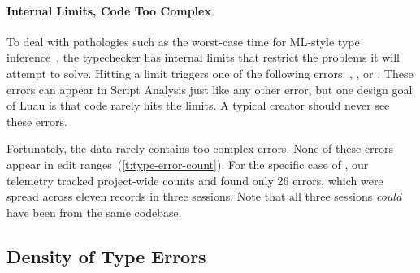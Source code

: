 \documentclass[english,submission,cleveref]{programming}
\begin{document}
\paragraph{Internal Limits, Code Too Complex}
\label{s:code-too-complex}

To deal with pathologies such as the worst-case time for ML-style type
inference~\cite{m-popl-1990,ktu-caap-1990}, the typechecker
has internal limits that restrict the problems it will attempt to solve.
Hitting a limit triggers one of the following errors:
,
, or
.
These errors can appear in Script Analysis just like any other
error, but one design goal of Luau is that code rarely hits the limits.
A typical creator should never see these errors.

Fortunately, the data rarely contains too-complex errors.
None of these errors appear in edit ranges~(\cref{t:type-error-count}).
For the specific case of , our telemetry tracked project-wide
counts and found only 26 errors, which were spread across eleven
records in three sessions.
Note that all three sessions \emph{could} have been from the same codebase.


\subsection{Density of Type Errors}
\end{document}
